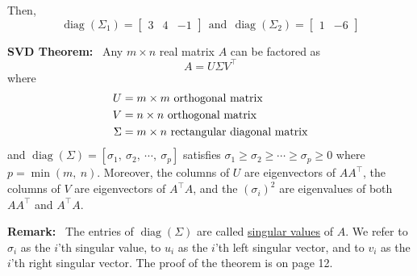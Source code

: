 \documentclass[letterpaper]{article}
\begin{document}
    Then,
$$
        \operatorname{diag}\left(\Sigma_1\right) = \begin{bmatrix} 3 & 4 & -1 \end{bmatrix}~~\text{and}~~
        \operatorname{diag}\left(\Sigma_2\right) = \begin{bmatrix} 1 & -6 \end{bmatrix}
$$

\newpage

\noindent \textbf{SVD Theorem:}~ Any $m\times n$ real matrix $A$ can be factored as
    \begin{equation*}
        A=U\Sigma V^\top
    \end{equation*}
    where
    \begin{align*}
        U &= m\times m\textnormal{ orthogonal matrix}\\
        V &= n\times n\textnormal{ orthogonal matrix}\\
        \Sigma &= m\times n\textnormal{ rectangular diagonal matrix}
    \end{align*}
  and  $\operatorname{diag}(\Sigma)=[\sigma_1,\ \sigma_2,\ \cdots,\ \sigma_p]$ satisfies $\sigma_1\geq\sigma_2\geq\cdots\geq\sigma_p\geq0$ where $p=\operatorname{min}(m,\ n)$. Moreover, the columns of $U$ are eigenvectors of $A A^\top$, the columns of $V$ are eigenvectors of $A^\top A$, and the $(\sigma_i)^2$ are eigenvalues of both $AA^\top$ and $A^\top  A$.

\noindent \textbf{Remark:}~ The entries of $\operatorname{diag}(\Sigma)$ are called \underline{singular values} of $A$.  We refer to $\sigma_i$  as the $i$'th singular value, to $u_i$ as the $i$'th left singular vector, and to $v_i$ as the $i$'th  right singular vector. The proof of the theorem is on page 12.

\newpage
\end{document}
